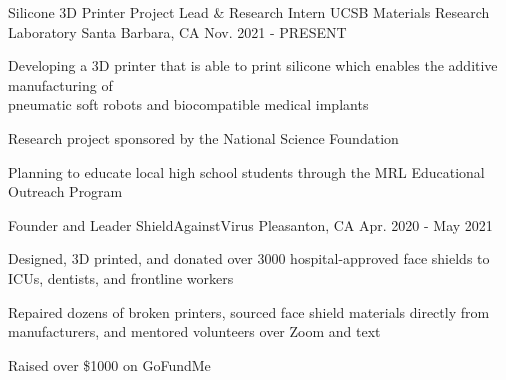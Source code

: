 \begin{cventries}
\cventry
{Silicone 3D Printer Project Lead \& Research Intern} %
{UCSB Materials Research Laboratory} %
{Santa Barbara, CA} %
{Nov. 2021 - PRESENT} %
{ %
\begin{cvitems}
\item {Developing a 3D printer that is able to print silicone which enables the additive manufacturing of \\ pneumatic soft robots and biocompatible medical implants}
\item {Research project sponsored by the National Science Foundation}
\item {Planning to educate local high school students through the MRL Educational Outreach Program}
\end{cvitems}
}







\cventry
{Founder and Leader} %
{ShieldAgainstVirus} %
{Pleasanton, CA} %
{Apr. 2020 - May 2021} %
{ %
\begin{cvitems}
\item {Designed, 3D printed, and donated over 3000 hospital-approved face shields to ICUs, dentists, and frontline workers}
\item {Repaired dozens of broken printers, sourced face shield materials directly from\\ manufacturers, and mentored volunteers over Zoom and text}
\item {Raised over \$1000 on GoFundMe}
\end{cvitems}
}






\end{cventries}
